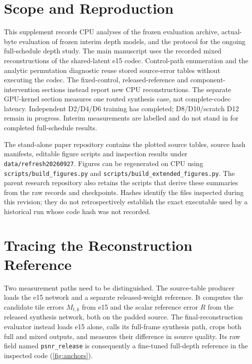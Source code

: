 \section{Scope and Reproduction}

This supplement records CPU analyses of the frozen evaluation archive,
actual-byte evaluation of frozen interim depth models, and the protocol
for the ongoing full-schedule depth study. The main manuscript uses
the recorded mixed reconstructions of the shared-latent e15 codec.
Control-path enumeration and the analytic permutation diagnostic reuse
stored source-error tables without executing the codec. The fixed-control,
released-reference and component-intervention sections instead report
new CPU reconstructions. The separate GPU-kernel section measures one routed
synthesis case, not complete-codec latency. Independent D2/D4/D6 training
has completed; D8/D10/scratch D12 remain in progress. Interim measurements
are labelled and do not stand in for completed full-schedule results.

The stand-alone paper repository contains the plotted source tables, source
hash manifests, editable figure scripts and inspection results under
\texttt{data/refresh20260927}. Figures can be regenerated on CPU using
\texttt{scripts/build\_figures.py} and
\texttt{scripts/build\_extended\_figures.py}. The parent research repository
also retains the scripts that derive these summaries from the raw records
and checkpoints. Hashes identify the files inspected during this revision;
they do not retrospectively establish the exact executable used by a
historical run whose code hash was not recorded.

\section{Tracing the Reconstruction Reference}

Two measurement paths need to be distinguished. The source-table producer
loads the e15 network and a separate released-weight reference. It computes
the candidate tile errors $M_{t,k}$ from e15 and the scalar reference error
$R$ from the released synthesis network, both on the padded source.
The final-reconstruction evaluator instead loads e15 alone, calls its
full-frame synthesis path, crops both full and mixed outputs, and measures
their difference in source quality. Its raw field named
\texttt{psnr\_release} is consequently a fine-tuned full-depth reference
in the inspected code (\cref{fig:anchors}).

